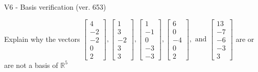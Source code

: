 \begin{exercise}
  \begin{exerciseTitle}V6 - Basis verification (ver. 653)\end{exerciseTitle}
  \begin{exerciseStatement}
    Explain why the vectors \(\left[\begin{array}{r}
4 \\
-2 \\
-2 \\
0 \\
2
\end{array}\right] , \left[\begin{array}{r}
1 \\
3 \\
-2 \\
3 \\
3
\end{array}\right] , \left[\begin{array}{r}
1 \\
-1 \\
0 \\
-3 \\
-3
\end{array}\right] , \left[\begin{array}{r}
6 \\
0 \\
-4 \\
0 \\
2
\end{array}\right] , \text{ and } \left[\begin{array}{r}
13 \\
-7 \\
-6 \\
-3 \\
3
\end{array}\right]\) are or are not a basis of \(\mathbb{R}^5\)	



\end{exerciseStatement}
\end{exercise}

